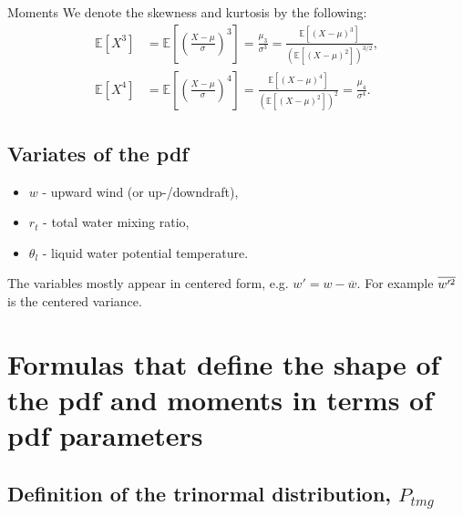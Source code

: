 \documentclass[10pt]{beamer}
\numberwithin{equation}{section}
\begin{document}
    \begin{frame}{Moments}
        We denote the skewness and kurtosis by the following:
        \begin{align}
            \mathbb{E}[X^3]
            &= \mathbb{E}\left[\left(\frac{X-\mu}{\sigma}\right)^3\right]
            = \frac{\mu_3}{\sigma^3}
            = \frac{\mathbb{E}[(X-\mu)^3]}{(\mathbb{E}[(X-\mu)^2])^{3/2}}, \\
            \mathbb{E}[X^4]
            &= \mathbb{E}\left[\left(\frac{X-\mu}{\sigma}\right)^4\right]
            = \frac{\mathbb{E}[(X-\mu)^4]}{(\mathbb{E}[(X-\mu)^2])^2}
            = \frac{\mu_4}{\sigma^4}.
        \end{align}
    \end{frame}

    \subsection{Variates of the pdf}\label{subsec:variates-of-the-pdf}

    \begin{frame}
        \begin{itemize}
            \item $w$ - upward wind (or up-/downdraft),
            \item $r_t$ - total water mixing ratio,
            \item $\theta_l$ - liquid water potential temperature.
        \end{itemize}
        \vspace{2cm}

        The variables mostly appear in centered form,
        e.g. $w' = w - \overline{w}$.
        For example $\overline{w'^2}$ is the centered variance.
    \end{frame}


    \section{Formulas that define the shape of the pdf and moments in terms of pdf parameters}
    \label{sec:formulas-that-define-the-shape-of-the-pdf-and-moments-in-terms-of-pdf-parameters}

    \subsection{Definition of the trinormal distribution, \texorpdfstring{$P_{tmg}$}{P tmg}}
    \label{subsec:definition-of-the-trinormal-distribution-p_tmg}
\end{document}

